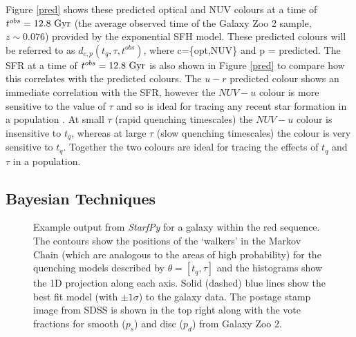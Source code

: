 \documentclass[useAMS,usenatbib]{mn2e}
\def\changed    {\color{titlecol} }
\begin{document}
Figure \ref{pred} shows these predicted optical and NUV colours at a time of $t^{obs} = 12.8 ~\rm{Gyr}$ (the average observed time of the Galaxy Zoo 2 sample, $z \sim 0.076$) provided by the exponential SFH model. These predicted colours will be referred to as $d_{c,p}(t_{q}, \tau, t^{obs})$, where c=\{opt,NUV\} and p = predicted. The SFR at a time of $t^{obs}=12.8~\rm{Gyr}$ is also shown in Figure \ref{pred} to compare how this correlates with the predicted colours. The $u-r$ predicted colour shows an immediate correlation with the SFR, however the $NUV-u$ colour is more sensitive to the value of $\tau$ and so is ideal for tracing any recent star formation in a population . At small $\tau$ (rapid quenching timescales) the $NUV-u$ colour is insensitive to $t_{q}$, whereas at large $\tau$ (slow quenching timescales) the colour is very sensitive to $t_{q}$. Together the two colours are ideal for tracing the effects of $t_{q}$ and $\tau$ in a population. 




\subsection{Bayesian Techniques}\label{stats}

\begin{figure}
\caption{{\changed Example output from \emph{StarfPy} for a galaxy within the red sequence. The contours show the positions of the `walkers' in the Markov Chain (which are analogous to the areas of high probability) for the quenching models described by $\theta = [t_q, \tau]$ and the histograms show the 1D projection along each axis. Solid (dashed) blue lines show the best fit model (with $\pm 1\sigma$) to the galaxy data. The postage stamp image from SDSS is shown in the top right along with the vote fractions for smooth ($p_s$) and disc ($p_d$) from Galaxy Zoo 2.} }
\label{one_example}
\end{figure}
\end{document}
